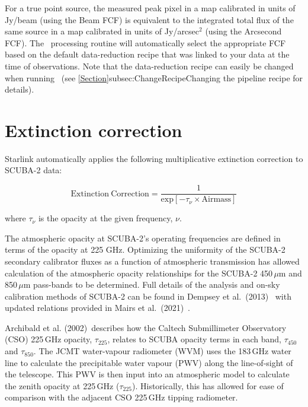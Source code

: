 For a true point source, the measured peak pixel in a map calibrated in units of Jy/beam
(using the Beam FCF) is equivalent to the integrated total flux of the same source in a map
calibrated in units of Jy/arcsec$^{2}$ (using the Arcsecond FCF). The \oracdr\ processing
routine will automatically select the appropriate FCF based on the default data-reduction recipe
that was linked to your data at the time of observations. Note that the data-reduction recipe can
easily be changed when running \oracdr\ (see
\cref{Section}{subsec:ChangeRecipe}{Changing the pipeline recipe} for details).

\section{Extinction correction}

Starlink automatically applies the following multiplicative extinction correction to SCUBA-2 data:

\begin{equation}
\label{eq:extcor}
\mathrm{Extinction\:Correction} = \frac{1}{\mathrm{exp}[-\tau_{\nu}\times\mathrm{Airmass}]}
\end{equation}

where $\tau_{\nu}$ is the opacity at the given frequency, $\nu$.

The atmospheric opacity at SCUBA-2’s operating frequencies are defined in
terms of the opacity at 225 GHz. Optimizing the uniformity of the SCUBA-2 secondary
calibrator fluxes as a function of atmospheric transmission has allowed calculation
of the atmospheric opacity relationships for the SCUBA-2 450\,$\mu$m and
850\,$\mu$m pass-bands to be determined. Full details of the analysis
and on-sky calibration methods of SCUBA-2 can be found in Dempsey et
al.\ (2013)~\cite{dempsey12}\cite{dempsey-spie} with
updated relations provided in Mairs et al.\ (2021)~\cite{mairs21}.

Archibald et al. (2002)\,\cite{archibald} describes how the Caltech
Submillimeter Observatory (CSO) 225\,GHz opacity, $\tau_{225}$,
relates to SCUBA opacity terms in each band, $\tau_{450}$ and
$\tau_{850}$. The JCMT water-vapour radiometer (WVM) uses the 183\,GHz
water line to calculate the precipitable water vapour (PWV) along the
line-of-sight of the telescope. This PWV is then input into an
atmospheric model to calculate the zenith opacity at 225\,GHz
($\tau_{225}$). Historically, this has allowed for ease of
comparison with the adjacent CSO 225\,GHz tipping radiometer.

